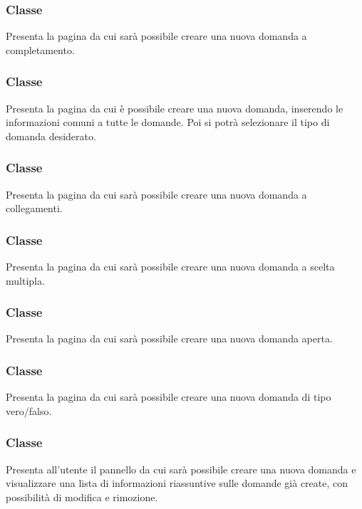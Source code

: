 \subsubsection{Classe }
Presenta la pagina da cui sarà possibile creare una nuova domanda a completamento.
\begin{itemize}
\end{itemize}
\subsubsection{Classe }
Presenta la pagina da cui è possibile creare una nuova domanda, inserendo le informazioni comuni a tutte le domande. Poi si potrà selezionare il tipo di domanda desiderato.
\begin{itemize}
\end{itemize}
\subsubsection{Classe }
Presenta la pagina da cui sarà possibile creare una nuova domanda a collegamenti.
\begin{itemize}
\end{itemize}
\subsubsection{Classe }
Presenta la pagina da cui sarà possibile creare una nuova domanda a scelta multipla.
\begin{itemize}
\end{itemize}
\subsubsection{Classe }
Presenta la pagina da cui sarà possibile creare una nuova domanda aperta.
\begin{itemize}
\end{itemize}
\subsubsection{Classe }
Presenta la pagina da cui sarà possibile creare una nuova domanda di tipo vero/falso.
\begin{itemize}
\end{itemize}
\subsubsection{Classe }
Presenta all'utente il pannello da cui sarà possibile creare una nuova domanda e visualizzare una lista di informazioni riassuntive sulle domande già create, con possibilità di modifica e rimozione.
\begin{itemize}
\end{itemize}
